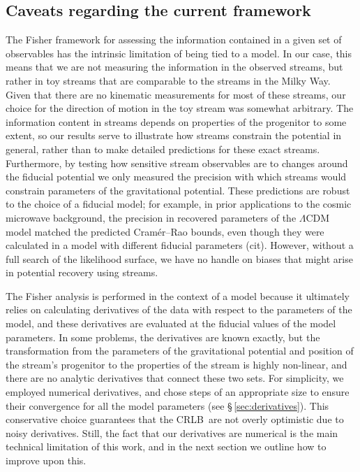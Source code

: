 \documentclass[modern]{aastex61}
\newcommand{\acronym}[1]{{\small{#1}}}
\newcommand{\CRLB}{\acronym{CRLB}}
\begin{document}
\subsection{Caveats regarding the current framework}
\label{sec:dis_caveats}
The Fisher framework for assessing the information contained in a given set of observables has the intrinsic limitation of being tied to a model.
In our case, this means that we are not measuring the information in the observed streams, but rather in toy streams that are comparable to the streams in the Milky Way.
Given that there are no kinematic measurements for most of these streams, our choice for the direction of motion in the toy stream was somewhat arbitrary.
The information content in streams depends on properties of the progenitor to some extent, so our results serve to illustrate how streams constrain the potential in general, rather than to make detailed predictions for these exact streams.
Furthermore, by testing how sensitive stream observables are to changes around the fiducial potential we only measured the precision with which streams would constrain parameters of the gravitational potential.
These predictions are robust to the choice of a fiducial model; for example, in prior applications to the cosmic microwave background, the precision in recovered parameters of the $\Lambda$CDM model matched the predicted Cram\'er--Rao bounds, even though they were calculated in a model with different fiducial parameters (cit).
However, without a full search of the likelihood surface, we have no handle on biases that might arise in potential recovery using streams.

The Fisher analysis is performed in the context of a model because it ultimately relies on calculating derivatives of the data with respect to the parameters of the model, and these derivatives are evaluated at the fiducial values of the model parameters.
In some problems, the derivatives are known exactly, but the transformation from the parameters of the gravitational potential and position of the stream's progenitor to the properties of the stream is highly non-linear, and there are no analytic derivatives that connect these two sets.
For simplicity, we employed numerical derivatives, and chose steps of an appropriate size to ensure their convergence for all the model parameters (see \S\,\ref{sec:derivatives}).
This conservative choice guarantees that the \CRLB\ are not overly optimistic due to noisy derivatives.
Still, the fact that our derivatives are numerical is the main technical limitation of this work, and in the next section we outline how to improve upon this.
\end{document}
